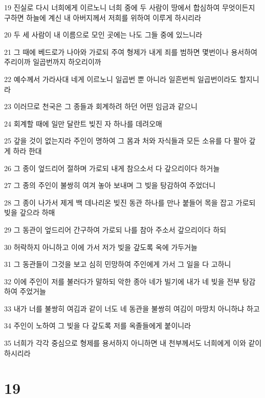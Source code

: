 \par 19 진실로 다시 너희에게 이르노니 너희 중에 두 사람이 땅에서 합심하여 무엇이든지 구하면 하늘에 계신 내 아버지께서 저희를 위하여 이루게 하시리라
\par 20 두 세 사람이 내 이름으로 모인 곳에는 나도 그들 중에 있느니라
\par 21 그 때에 베드로가 나아와 가로되 주여 형제가 내게 죄를 범하면 몇번이나 용서하여 주리이까 일곱번까지 하오리이까
\par 22 예수께서 가라사대 네게 이르노니 일곱번 뿐 아니라 일흔번씩 일곱번이라도 할지니라
\par 23 이러므로 천국은 그 종들과 회계하려 하던 어떤 임금과 같으니
\par 24 회계할 때에 일만 달란트 빚진 자 하나를 데려오매
\par 25 갚을 것이 없는지라 주인이 명하여 그 몸과 처와 자식들과 모든 소유를 다 팔아 갚게 하라 한대
\par 26 그 종이 엎드리어 절하며 가로되 내게 참으소서 다 갚으리이다 하거늘
\par 27 그 종의 주인이 불쌍히 여겨 놓아 보내며 그 빚을 탕감하여 주었더니
\par 28 그 종이 나가서 제게 백 데나리온 빚진 동관 하나를 만나 붙들어 목을 잡고 가로되 빚을 갚으라 하매
\par 29 그 동관이 엎드리어 간구하여 가로되 나를 참아 주소서 갚으리이다 하되
\par 30 허락하지 아니하고 이에 가서 저가 빚을 갚도록 옥에 가두거늘
\par 31 그 동관들이 그것을 보고 심히 민망하여 주인에게 가서 그 일을 다 고하니
\par 32 이에 주인이 저를 불러다가 말하되 악한 종아 네가 빌기에 내가 네 빚을 전부 탕감하여 주었거늘
\par 33 내가 너를 불쌍히 여김과 같이 너도 네 동관을 불쌍히 여김이 마땅치 아니하냐 하고
\par 34 주인이 노하여 그 빚을 다 갚도록 저를 옥졸들에게 붙이니라
\par 35 너희가 각각 중심으로 형제를 용서하지 아니하면 내 천부께서도 너희에게 이와 같이 하시리라

\chapter{19}

